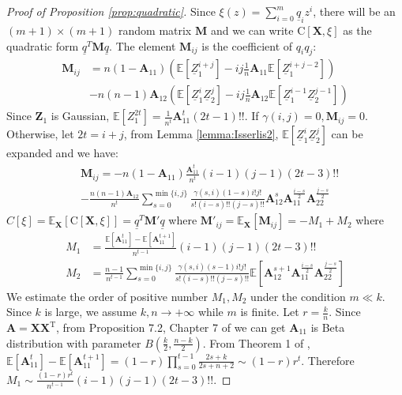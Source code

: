 \documentclass[conference]{IEEEtran}
\def\E{\mathbb{E}}
\def\T{\mathrm{T}}
\newcommand{\ide}[2]{ \gamma(#1,#2) }
\begin{document}
\begin{proof}[Proof of Proposition \ref{prop:quadratic}]
Since 
$\xi(z) = \sum_{i=0}^m \underline{q}_i z^i $,
there will be an $(m+1) \times (m+1) $ random matrix $\bm{M}$ and
we can write $\mathrm{C}[\bm{X}, \xi]$
as the quadratic form $ \underline{q}^T \bm{M} \underline{q} $.
The element $\bm{M}_{ij}$ is the coefficient of $q_iq_j$:
\begin{align*}
    \bm{M}_{ij} &= n(1-\bm{A}_{11}) (\E[\underline{Z}_1^{i+j}] -
    ij \frac{1}{n}\bm{A}_{11} \E[\underline{Z}_1^{i+j-2}])  \\
    &-n(n-1)\bm{A}_{12}(\E[\underline{Z}_1^i \underline{Z}_2^j] - ij \frac{1}{n}\bm{A}_{12}\E[\underline{Z}_1^{i-1}\underline{Z}_2^{j-1}])
\end{align*}
Since $\bm{Z}_1$ is Gaussian, $\E[Z_1^{2t}] = \frac{1}{n^t}\bm{A}_{11}^t (2t-1)!!$. If $\ide{i}{j} = 0, \bm{M}_{ij}=0$. Otherwise,
let $ 2t = i + j $, from Lemma \ref{lemma:Isserlis2}, $\E[\underline{Z}_1^i \underline{Z}_2^j]$ can be expanded and we have:
\begin{align*}
    &\bm{M}_{ij} = -n(1-\bm{A}_{11}) \frac{\bm{A}_{11}^t}{n^t}(i-1)(j-1)(2t-3)!! \\
    &-\frac{n(n-1)\bm{A}_{12}}{n^t}\sum_{s=0}^{\min\{i,j\}}
    \frac{\ide{s}{i}(1-s)i!j!}{s!(i-s)!!(j-s)!!}
    \bm{A}_{12}^s \bm{A}_{11}^{\frac{i - s}{2}}\bm{A}_{22}^{\frac{j - s}{2}}
\end{align*}
$C[\xi] = \E_{\bm{X}}[\mathrm{C}[\bm{X}, \xi]] =  \underline{q}^T \mathbf{M}' \underline{q}$ where $\mathbf{M}'_{ij} = \E_{\bm{X}} [\bm{M}_{ij}] = -M_1 + M_2$
where 
\begin{align*}
    M_1 & =   \frac{\E[\bm{A}_{11}^t]-\E[\bm{A}_{11}^{t+1}]}{n^{t-1}}(i-1)(j-1)(2t-3)!! \\
    M_2 & = \frac{n-1}{n^{t-1}}\sum_{s=0}^{\min\{i,j\}}
    \frac{\ide{s}{i}(s-1)i!j!}{s!(i-s)!!(j-s)!!}
    \E[\bm{A}_{12}^{s+1} \bm{A}_{11}^{\frac{i - s}{2}}\bm{A}_{22}^{\frac{j - s}{2}}]
\end{align*}
We estimate the order of positive number $M_1, M_2$ under the condition $ m \ll k$. Since $k$ is large, we assume $k, n \to +\infty$ while $m$ is finite. Let $ r= \frac{k}{n}$. Since $\bm{A}=\bm{X}\bm{X}^\T$, from Proposition 7.2, Chapter 7 of \cite{eaton1989group} we can get $\bm{A}_{11}$ is Beta distribution with parameter $B(\frac{k}{2}, \frac{n-k}{2})$.
From Theorem 1 of \cite{multivariateBeta},
$\E[\bm{A}_{11}^t]-\E[\bm{A}_{11}^{t+1}] = (1-r)\prod_{s=0}^{t-1} \frac{2s+k}{2s+n+2} \sim (1-r)r^t$. Therefore $M_1 \sim \frac{(1-r)r^t}{n^{t-1}}(i-1)(j-1)(2t-3)!!$.

\end{proof}
\end{document}
